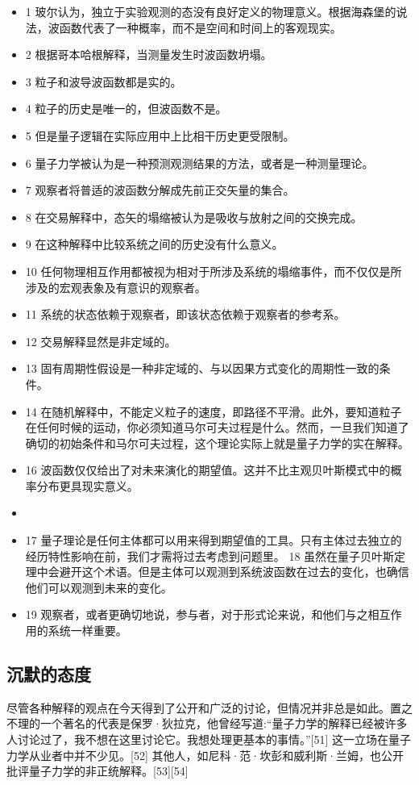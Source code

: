 \begin{itemize}
\item 1 玻尔认为，独立于实验观测的态没有良好定义的物理意义。根据海森堡的说法，波函数代表了一种概率，而不是空间和时间上的客观现实。
\item 2 根据哥本哈根解释，当测量发生时波函数坍塌。
\item 3 粒子和波导波函数都是实的。
\item 4 粒子的历史是唯一的，但波函数不是。
\item 5 但是量子逻辑在实际应用中上比相干历史更受限制。
\item 6 量子力学被认为是一种预测观测结果的方法，或者是一种测量理论。
\item 7 观察者将普适的波函数分解成先前正交矢量的集合。
\item 8 在交易解释中，态矢的塌缩被认为是吸收与放射之间的交换完成。
\item 9 在这种解释中比较系统之间的历史没有什么意义。
\item 10 任何物理相互作用都被视为相对于所涉及系统的塌缩事件，而不仅仅是所涉及的宏观表象及有意识的观察者。
\item 11 系统的状态依赖于观察者，即该状态依赖于观察者的参考系。
\item 12 交易解释显然是非定域的。
\item 13 固有周期性假设是一种非定域的、与以因果方式变化的周期性一致的条件。
\item 14 在随机解释中，不能定义粒子的速度，即路径不平滑。此外，要知道粒子在任何时候的运动，你必须知道马尔可夫过程是什么。然而，一旦我们知道了确切的初始条件和马尔可夫过程，这个理论实际上就是量子力学的实在解释。
\item 16 波函数仅仅给出了对未来演化的期望值。这并不比主观贝叶斯模式中的概率分布更具现实意义。
\item \item 17 量子理论是任何主体都可以用来得到期望值的工具。只有主体过去独立的经历特性影响在前，我们才需将过去考虑到问题里。
18 虽然在量子贝叶斯定理中会避开这个术语。但是主体可以观测到系统波函数在过去的变化，也确信他们可以观测到未来的变化。
\item 19 观察者，或者更确切地说，参与者，对于形式论来说，和他们与之相互作用的系统一样重要。
\end{itemize}

\subsection{沉默的态度}

尽管各种解释的观点在今天得到了公开和广泛的讨论，但情况并非总是如此。置之不理的一个著名的代表是保罗·狄拉克，他曾经写道:“量子力学的解释已经被许多人讨论过了，我不想在这里讨论它。我想处理更基本的事情。”[51] 这一立场在量子力学从业者中并不少见。[52] 其他人，如尼科·范·坎彭和威利斯·兰姆，也公开批评量子力学的非正统解释。[53][54]

